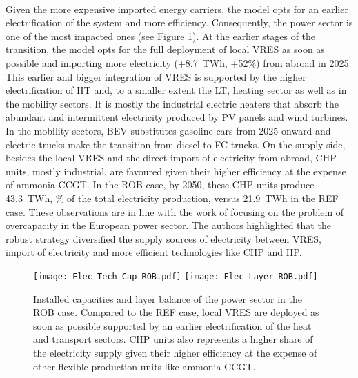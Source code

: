 \\

Given the more expensive imported energy carriers, the model opts for an earlier electrification of the system and more efficiency. Consequently, the power sector is one of the most impacted ones (see Figure \ref{fig:rob_pol_ROB_elec}). At the earlier stages of the transition,  the model opts for the full deployment of local \gls{VRES} as soon as possible and importing more electricity (\ie +8.7~TWh, +52\%) from abroad in 2025.  This earlier and bigger integration of \gls{VRES} is supported by the higher electrification of \gls{HT} and, to a smaller extent the \gls{LT}, heating sector as well as in the mobility sectors. It is mostly the industrial electric heaters that absorb the abundant and intermittent electricity produced by \gls{PV} panels and wind turbines. In the mobility sectors, \gls{BEV} substitutes gasoline cars from 2025 onward and electric trucks make the transition from diesel to \gls{FC} trucks.  On the supply side, besides the local \gls{VRES} and the direct import of electricity from abroad, \gls{CHP} units, mostly industrial, are favoured given their higher efficiency at the expense of ammonia-\gls{CCGT}. In the ROB case, by 2050, these \gls{CHP} units produce 43.3~TWh, \% of the total electricity production, versus 21.9~TWh in the REF case. These observations are in line with the work of  \citet{moret2020overcapacity} focusing on the problem of overcapacity in the European power sector. The authors highlighted that the robust strategy diversified the supply sources of electricity between \gls{VRES}, import of electricity and more efficient technologies like \gls{CHP} and \gls{HP}.

\begin{figure}[htbp!]
\centering
\texttt{[image: Elec\_Tech\_Cap\_ROB.pdf]}
\texttt{[image: Elec\_Layer\_ROB.pdf]}
\caption{Installed capacities and layer balance of the power sector in the ROB case. Compared to the REF case, local \gls{VRES} are deployed as soon as possible supported by an earlier electrification of the heat and transport sectors. \gls{CHP} units also represents a higher share of the electricity supply given their higher efficiency at the expense of other flexible production units like ammonia-\gls{CCGT}.}
\label{fig:rob_pol_ROB_elec}
\end{figure}

\\


